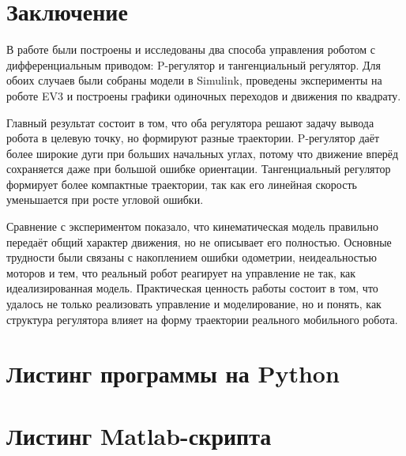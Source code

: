 \documentclass[a4paper, 12pt]{article}
\begin{document}
\section{Заключение}

В работе были построены и исследованы два способа управления роботом с дифференциальным приводом: P-регулятор и тангенциальный регулятор. Для обоих случаев были собраны модели в Simulink, проведены эксперименты на роботе EV3 и построены графики одиночных переходов и движения по квадрату.

Главный результат состоит в том, что оба регулятора решают задачу вывода робота в целевую точку, но формируют разные траектории. P-регулятор даёт более широкие дуги при больших начальных углах, потому что движение вперёд сохраняется даже при большой ошибке ориентации. Тангенциальный регулятор формирует более компактные траектории, так как его линейная скорость уменьшается при росте угловой ошибки.

Сравнение с экспериментом показало, что кинематическая модель правильно передаёт общий характер движения, но не описывает его полностью. Основные трудности были связаны с накоплением ошибки одометрии, неидеальностью моторов и тем, что реальный робот реагирует на управление не так, как идеализированная модель. Практическая ценность работы состоит в том, что удалось не только реализовать управление и моделирование, но и понять, как структура регулятора влияет на форму траектории реального мобильного робота.

\appendix
\section{Листинг программы на Python}


\section{Листинг Matlab-скрипта}

\end{document}
